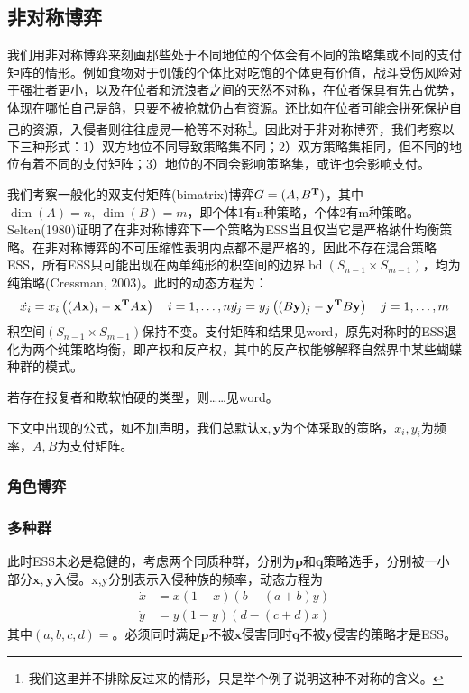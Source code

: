 \documentclass[lang=cn,12pt,a4paper]{elegantpaper}
\begin{document}
\subsection{非对称博弈}

我们用非对称博弈来刻画那些处于不同地位的个体会有不同的策略集或不同的支付矩阵的情形。例如食物对于饥饿的个体比对吃饱的个体更有价值，战斗受伤风险对于强壮者更小，以及在位者和流浪者之间的天然不对称，在位者保具有先占优势，体现在哪怕自己是鸽，只要不被抢就仍占有资源。还比如在位者可能会拼死保护自己的资源，入侵者则往往虚晃一枪等不对称\footnote{我们这里并不排除反过来的情形，只是举个例子说明这种不对称的含义。}。因此对于非对称博弈，我们考察以下三种形式：1）双方地位不同导致策略集不同；2）双方策略集相同，但不同的地位有着不同的支付矩阵；3）地位的不同会影响策略集，或许也会影响支付。



我们考察一般化的双支付矩阵(bimatrix)博弈$G=(A,B^{\bf{T}})$，其中$\dim(A)=n,\ \dim (B)=m$，即个体1有n种策略，个体2有m种策略。Selten(1980)证明了在非对称博弈下一个策略为ESS当且仅当它是严格纳什均衡策略。在非对称博弈的不可压缩性表明内点都不是严格的，因此不存在混合策略ESS，所有ESS只可能出现在两单纯形的积空间的边界$\operatorname{bd} (S_{n-1} \times S_{m-1})$，均为纯策略(Cressman, 2003)。此时的动态方程为：
\begin{equation}
\dot{{x}_{i}}=x_{i}\left((A \mathbf{x})_{i}-\mathbf{x}^{\bf{T}}  A \mathbf{x}\right) \quad i=1, \ldots, n\\
\dot{{y}_{j}}=y_{j}\left((B \mathbf{y})_{j}-\mathbf{y}^{\bf{T}}  B \mathbf{y}\right) \quad j=1, \ldots, m
\end{equation}
积空间$ (S_{n-1} \times S_{m-1})$保持不变。支付矩阵和结果见word，原先对称时的ESS退化为两个纯策略均衡，即产权和反产权，其中的反产权能够解释自然界中某些蝴蝶种群的模式。

若存在报复者和欺软怕硬的类型，则……见word。

下文中出现的公式，如不加声明，我们总默认$\mathbf{x},\mathbf{y}$为个体采取的策略，$x_i,y_i$为频率，$A,B$为支付矩阵。

\subsubsection{角色博弈}



\subsubsection{多种群}

此时ESS未必是稳健的，考虑两个同质种群，分别为$\mathbf{p}$和$\mathbf{q}$策略选手，分别被一小部分$\mathbf{x},\mathbf{y}$入侵。x,y分别表示入侵种族的频率，动态方程为
\begin{equation}
\begin{aligned}
\dot{x} &=x(1-x)(b-(a+b) y) \\
\dot{y} &=y(1-y)(d-(c+d) x)
\end{aligned}
\end{equation}
其中\((a,b,c,d)=\)。必须同时满足$\mathbf{p}$不被$\mathbf{x}$侵害同时$\mathbf{q}$不被$\mathbf{y}$侵害的策略才是ESS。
\end{document}
